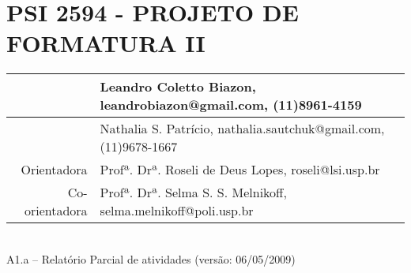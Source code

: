 \documentclass[a4paper,12pt,font=plain,header=plain]{abnt}
\begin{document}
  \capa

	\renewenvironment{center}{}{}
	\section*{PSI 2594 - PROJETO DE FORMATURA II}

	\begin{tabular}[|l|]{ |r|l| }
	\hline
				& Leandro Coletto Biazon, leandrobiazon@gmail.com, (11)8961-4159 \\
			\hline
				& Nathalia S. Patrício, nathalia.sautchuk@gmail.com, (11)9678-1667 \\
			\hline
				Orientadora & Profª. Drª. Roseli de Deus Lopes, roseli@lsi.usp.br \\
			\hline
			  Co-orientadora & Profª. Drª. Selma S. S. Melnikoff, selma.melnikoff@poli.usp.br \\
			\hline
			\end{tabular} \\

			A1.a – Relatório Parcial de atividades (versão: 06/05/2009) \\

\end{document}
